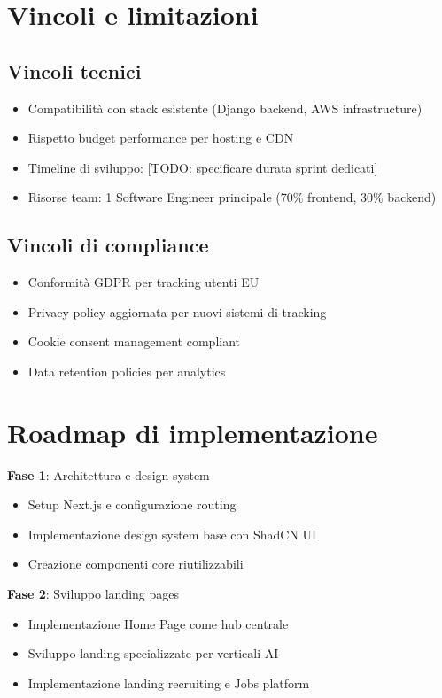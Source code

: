 \section{Vincoli e limitazioni}
\subsection{Vincoli tecnici}
\begin{itemize}
  \item Compatibilità con stack esistente (Django backend, AWS infrastructure)
  \item Rispetto budget performance per hosting e CDN
  \item Timeline di sviluppo: [TODO: specificare durata sprint dedicati]
  \item Risorse team: 1 Software Engineer principale (70\% frontend, 30\% backend)
\end{itemize}

\subsection{Vincoli di compliance}
\begin{itemize}
  \item Conformità GDPR per tracking utenti EU
  \item Privacy policy aggiornata per nuovi sistemi di tracking
  \item Cookie consent management compliant
  \item Data retention policies per analytics
\end{itemize}

\section{Roadmap di implementazione}
\textbf{Fase 1}: Architettura e design system
\begin{itemize}
  \item Setup Next.js e configurazione routing
  \item Implementazione design system base con ShadCN UI
  \item Creazione componenti core riutilizzabili
\end{itemize}

\textbf{Fase 2}: Sviluppo landing pages
\begin{itemize}
  \item Implementazione Home Page come hub centrale
  \item Sviluppo landing specializzate per verticali AI
  \item Implementazione landing recruiting e Jobs platform
\end{itemize}


